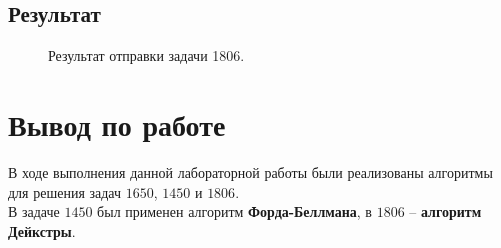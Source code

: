 \documentclass[a5paper, 10pt]{article}
\theoremstyle{definition}
\theoremstyle{plain}
\theoremstyle{remark}
\begin{document}
\subsection{Результат}
\begin{figure}[h!]
\caption{Результат отправки задачи 1806.}
\end{figure}



\newpage
\section{Вывод по работе}
В ходе выполнения данной лабораторной работы были реализованы алгоритмы для решения задач $1650$, $1450$ и $1806$.\\

 В задаче  $1450$ был применен алгоритм \textbf{Форда-Беллмана}, в $1806$ -- \textbf{алгоритм Дейкстры}.
\end{document}
